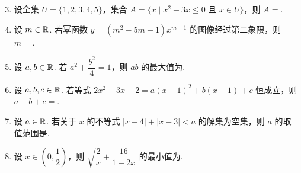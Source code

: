 \begin{enumerate}
\setcounter{enumi}{2}

\item 设全集 $U=\{1,2,3,4,5\}$，集合 $A=\{x\mid x^2-3x\leqslant0\text{ 且 }x\in U\}$，则 $\overline{A}=$\blankline[4.4em].

\ifanswer
\solbegin
{}
\solend
\fi

\item 设 $m\in\mathbb{R}$. 若幂函数 $y=(m^2-5m+1)x^{m+1}$ 的图像经过第二象限，则 $m=$\blankline[4.4em].

\ifanswer
\solbegin
{}
\solend
\fi

\item 设 $a,b\in\mathbb{R}$. 若 $a^2+\dfrac{b^2}{4}=1$，则 $ab$ 的最大值为\blankline[4.4em].

\ifanswer
\solbegin
{}
\solend
\fi

\item 设 $a,b,c\in\mathbb{R}$. 若等式 $2x^2-3x-2=a(x-1)^2+b(x-1)+c$ 恒成立，则 $a-b+c=$\blankline[4.4em].

\ifanswer
\solbegin
{}
\solend
\fi

\item 设 $a\in\mathbb{R}$. 若关于 $x$ 的不等式 $\lvert x+4\rvert+\lvert x-3\rvert<a$ 的解集为空集，则 $a$ 的取值范围是\blankline[4.4em].

\ifanswer
\solbegin
{}
\step{原不等式的解集为空集当且仅当 $a\leqslant7$，即 $a\in(-\infty,7]$.}
\solend
\fi

\item 设 $x\in\left(0,\dfrac{1}{2}\right)$，则 $\sqrt{\dfrac{2}{x}+\dfrac{16}{1-2x}}$ 的最小值为\blankline[4.4em].


\end{enumerate}
